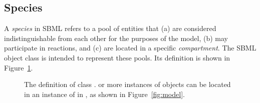 \subsection{Species}
\label{sec:species}

A \emph{species} in SBML refers to a pool of entities that (a) are
considered indistinguishable from each other for the purposes of
the model, (b) may participate in reactions, and (c) are located in a
specific \emph{compartment}.  The SBML \Species object class is
intended to represent these pools.  Its definition is shown in
Figure~\ref{fig:species}.

\begin{figure}[htb]
  \vspace*{-1ex}
  \centering
  \small
  \vspace*{-1ex}
  \caption{The definition of class \Species.   or more
    instances of \Species objects can be located in an instance of
    \ListOfSpecies in \Model, as shown in
    Figure~\protect\ref{fig:model}.}
  \label{fig:species}
\end{figure}


